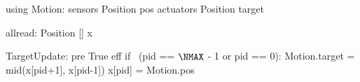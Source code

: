using Motion:
  sensors Position pos
  actuators Position target

allread: Position [] x $\label{lineform-allread}$

TargetUpdate:
  pre True
  eff if ~(pid == $\NMAX$ - 1 or pid == 0):
     Motion.target = mid(x[pid+1], x[pid-1])
     x[pid] = Motion.pos